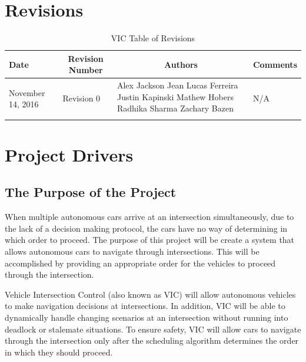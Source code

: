 \documentclass [11pt]{article}
\begin{document}
\section{Revisions}
\begin{longtable}{| p{ } | p{ } | p{ } | p{ } |}

\hline 
\centering \textbf{Date} & 
\multicolumn{1}{c}{\textbf {Revision Number}} &
\multicolumn{1}{|c}{\textbf {Authors}} & 
\multicolumn{1}{|c|}{\textbf {Comments}} \\ \hline

\multirow{4}{*}{\centering November 14, 2016}  & 
\multirow{4}{*}{Revision 0}& 
{Alex Jackson \newline
Jean Lucas Ferreira \newline
Justin Kapinski\newline
Mathew Hobers\newline
Radhika Sharma\newline
Zachary Bazen}
&
 \multirow{4}{*}{N/A} \\ 
\hline 

\caption{VIC Table of Revisions} 
\end{longtable}
\pagebreak



\section {\textbf{Project Drivers}}


\subsection{The Purpose of the Project} 
When multiple autonomous cars arrive at an intersection simultaneously, due to the lack of a decision making protocol, the cars have no way of determining in which order to proceed. The purpose of this project will be create a system that allows autonomous cars to navigate through  intersections. This will be accomplished by providing an appropriate order for the vehicles to proceed through the intersection.  \newline


Vehicle Intersection Control (also known as VIC) will allow autonomous vehicles to make navigation decisions at intersections. In addition, VIC will be able to dynamically handle changing scenarios at an intersection without running into deadlock or stalemate situations. To ensure safety, VIC will allow cars to navigate through the intersection only after the scheduling algorithm determines the order in which they should proceed. \newline
\end{document}
